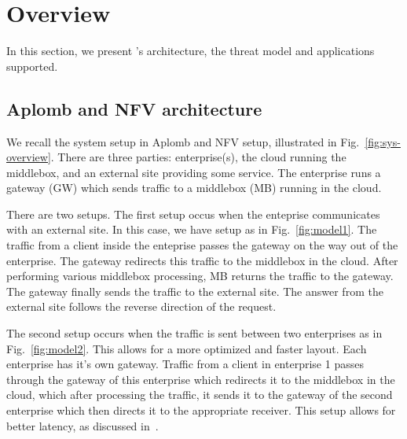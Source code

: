 
\section{Overview}\label{sec:overview}

In this section, we present \sys's architecture, the threat model and applications supported.

\subsection{Aplomb and NFV architecture}

We recall the system setup in Aplomb and NFV setup, illustrated in Fig.~\ref{fig:sys-overview}. 
There are three parties: enterprise(s), the cloud running the middlebox, and an external site providing
some service. 
The enterprise runs a gateway (GW) which sends traffic to a middlebox (MB) running in the cloud.

There are two setups. The first setup occus when the enteprise communicates with an external site.  In this case, we have setup as in Fig.~\ref{fig:model1}.
The traffic from a client inside the enteprise passes the gateway on the way out of the enterprise. The gateway redirects this traffic to the middlebox in the cloud.
After performing various middlebox processing, MB returns the traffic to the gateway. The gateway finally sends the traffic to the external site. 
The answer from the external site follows the reverse direction of the
request.


The second setup occurs when the traffic is sent between two enterprises as in Fig.~\ref{fig:model2}. This allows for a more optimized and faster layout. Each enterprise has it's own gateway.
Traffic from a client in enterprise 1 passes through the gateway of this enterprise which redirects it to the middlebox in the cloud, which after processing the traffic, it sends it to the gateway of the second enterprise which then directs it to the appropriate receiver. This setup allows for better latency, as discussed in~\cite{aplomb}.





